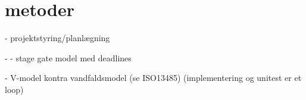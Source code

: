 \section{metoder}
- projektstyring/planlægning


- - stage gate model med deadlines


- V-model kontra vandfaldsmodel (se ISO13485) (implementering og unitest er et loop)